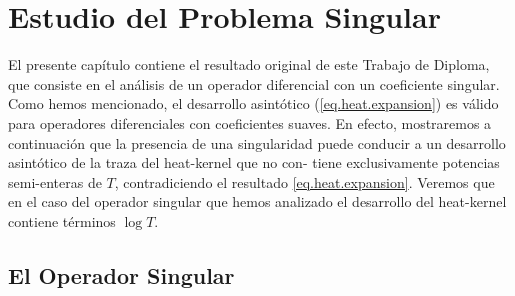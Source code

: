 \chapter{Estudio del Problema Singular}
{\label{cap.singular}}

El presente capítulo contiene el resultado original de este Trabajo de Diploma, que consiste en el análisis de un operador diferencial con un coeficiente singular. Como hemos mencionado, el desarrollo asintótico (\ref{eq.heat.expansion})
es válido para operadores diferenciales con coeficientes suaves. En efecto,
mostraremos a continuación que la presencia de una singularidad puede
conducir a un desarrollo asintótico de la traza del heat-kernel que no con-
tiene exclusivamente potencias semi-enteras de $T$, contradiciendo el resultado \ref{eq.heat.expansion}. Veremos que
en el caso del operador singular que hemos analizado el desarrollo del heat-kernel contiene términos $\log T$.


\section{El Operador Singular}


